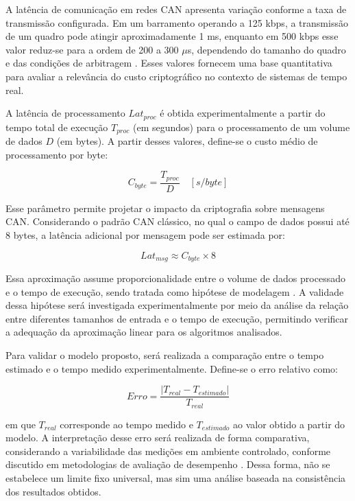 A latência de comunicação em redes CAN apresenta variação conforme a taxa de transmissão configurada. Em um barramento operando a 125 kbps, a transmissão de um quadro pode atingir aproximadamente 1 ms, enquanto em 500 kbps esse valor reduz-se para a ordem de 200 a 300 $\mu$s, dependendo do tamanho do quadro e das condições de arbitragem \cite{navet2017automotive}. Esses valores fornecem uma base quantitativa para avaliar a relevância do custo criptográfico no contexto de sistemas de tempo real.

A latência de processamento $Lat_{proc}$ é obtida experimentalmente a partir do tempo total de execução $T_{proc}$ (em segundos) para o processamento de um volume de dados $D$ (em bytes). A partir desses valores, define-se o custo médio de processamento por byte:

\begin{equation}
C_{byte} = \frac{T_{proc}}{D} \quad [s/byte]
\end{equation}

Esse parâmetro permite projetar o impacto da criptografia sobre mensagens CAN. Considerando o padrão CAN clássico, no qual o campo de dados possui até 8 bytes, a latência adicional por mensagem pode ser estimada por:

\begin{equation}
Lat_{msg} \approx C_{byte} \times 8
\end{equation}

Essa aproximação assume proporcionalidade entre o volume de dados processado e o tempo de execução, sendo tratada como hipótese de modelagem \cite{montgomery2017design}. A validade dessa hipótese será investigada experimentalmente por meio da análise da relação entre diferentes tamanhos de entrada e o tempo de execução, permitindo verificar a adequação da aproximação linear para os algoritmos analisados.

Para validar o modelo proposto, será realizada a comparação entre o tempo estimado e o tempo medido experimentalmente. Define-se o erro relativo como:

\begin{equation}
Erro = \frac{|T_{real} - T_{estimado}|}{T_{real}}
\end{equation}

em que $T_{real}$ corresponde ao tempo medido e $T_{estimado}$ ao valor obtido a partir do modelo. A interpretação desse erro será realizada de forma comparativa, considerando a variabilidade das medições em ambiente controlado, conforme discutido em metodologias de avaliação de desempenho \cite{jain2010art}. Dessa forma, não se estabelece um limite fixo universal, mas sim uma análise baseada na consistência dos resultados obtidos.

